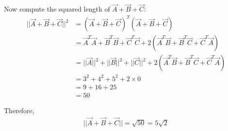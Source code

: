 \documentclass[journal]{IEEEtran}
\begin{document}
Now compute the squared length of $\Vec{A} + \Vec{B} + \Vec{C}$:
\begin{align}
||\Vec{A} + \Vec{B} + \Vec{C}||^2 &= (\Vec{A} + \Vec{B} + \Vec{C})^T (\Vec{A} + \Vec{B} + \Vec{C}) \\
&= \Vec{A}^T \Vec{A} + \Vec{B}^T \Vec{B} + \Vec{C}^T \Vec{C} + 2(\Vec{A}^T \Vec{B} + \Vec{B}^T \Vec{C} + \Vec{C}^T \Vec{A}) \\
&=||\Vec{A}||^2+||\Vec{B}||^2+||\Vec{C}||^2 + 2(\Vec{A}^T \Vec{B} + \Vec{B}^T \Vec{C} + \Vec{C}^T \Vec{A}) \\
&= 3^2 + 4^2 + 5^2 + 2 \times 0 \\
&= 9 + 16 + 25 \\
&= 50
\end{align}

Therefore,
\begin{align}
||\Vec{A} + \Vec{B} + \Vec{C}||= \sqrt{50} = 5 \sqrt{2}
\end{align}
\end{document}
